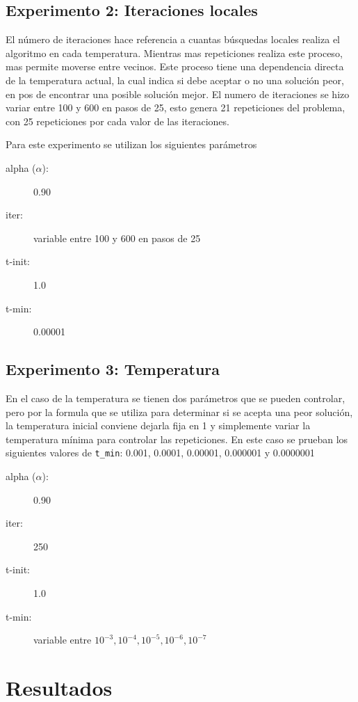 \documentclass[letterpaper,10pt]{article}
\begin{document}
\subsection{Experimento 2: Iteraciones locales}

El número de iteraciones hace referencia a cuantas búsquedas locales realiza el algoritmo en cada temperatura.
Mientras mas repeticiones realiza este proceso, mas permite moverse entre vecinos. Este proceso tiene una dependencia directa de la temperatura actual, la cual indica si debe aceptar o no una solución peor, en pos de encontrar una posible solución mejor. El numero de iteraciones se hizo variar entre 100 y 600 en pasos de 25, esto genera 21 repeticiones del problema, con 25 repeticiones por cada valor de las iteraciones.

Para este experimento se utilizan los siguientes parámetros
\begin{description}
  \item[alpha ($\alpha$):] 0.90
  \item[iter:] variable entre 100 y 600 en pasos de 25
  \item[t-init:] 1.0
  \item[t-min:] 0.00001
\end{description}

\subsection{Experimento 3: Temperatura}


En el caso de la temperatura se tienen dos parámetros que se pueden controlar, pero por la  formula que se utiliza para determinar si se acepta una peor solución, la temperatura inicial conviene dejarla fija en 1 y simplemente variar la temperatura mínima para controlar las repeticiones. En este caso se prueban los siguientes valores de \texttt{t\_min}: 0.001, 0.0001, 0.00001, 0.000001 y 0.0000001

\begin{description}
  \item[alpha ($\alpha$):] 0.90
  \item[iter:] 250
  \item[t-init:] 1.0
  \item[t-min:] variable entre $10^{-3}, 10^{-4}, 10^{-5}, 10^{-6}, 10^{-7}$
\end{description}

\section{Resultados}
\end{document}
